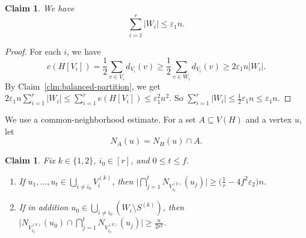 \documentclass[11pt,a4paper]{article}
\newtheorem{claim}[theorem]{Claim}
\theoremstyle{definition}
\theoremstyle{plain}
\newcommand{\eps}{\varepsilon}
\renewcommand{\le}{\leqslant}
\renewcommand{\ge}{\geqslant}
\begin{document}
\begin{claim}\label{clm:W-small}
We have
\[
  \sum_{i=1}^r |W_i|\le \eps_1n.
\]
\end{claim}

\begin{proof}
For each $i$, we have 
\[
  e(H[V_i])
  =
  \frac12\sum_{v\in V_i}d_{V_i}(v)
  \ge
  \frac12\sum_{v\in W_i}d_{V_i}(v)
  \ge
  2\eps_1n|W_i|.
\]
By Claim~\ref{clm:balanced-partition}, we get 
$2\eps_1n\sum_{i=1}^r |W_i| \le 
  \sum_{i=1}^r e(H[V_i])\le \eps_1^2n^2$. 
So $ \sum_{i=1}^r |W_i|
  \le
  \frac12\eps_1n
  \le
  \eps_1n.$ 
\end{proof}

We use a common-neighborhood estimate.  For a set $A\subseteq V(H)$ and a vertex $u$, let
\[
  N_A(u)=N_H(u)\cap A.
\]


\begin{claim}\label{clm:common-neighborhood}
Fix $k\in\{1,2\}$, $i_0\in[r]$, and $0\le t\le f$. 
\begin{enumerate}[label=\textup{(\roman*)}]
\item If $u_1,\ldots,u_t\in\bigcup_{i\ne i_0}V_i^{(k)}$, then
  $\big|\bigcap_{j=1}^t N_{V_{i_0}^{(k)}}(u_j)\big|\ge\big(\tfrac1r-4f^2\eps_2\big)n$.
\item If in addition $u_0\in\bigcup_{i\ne i_0}(W_i\setminus S^{(k)})$, then
  $\big|N_{V_{i_0}^{(k)}}(u_0)\cap\bigcap_{j=1}^t N_{V_{i_0}^{(k)}}(u_j)\big|\ge\tfrac{n}{2r^2}$.
\end{enumerate}
\end{claim}
\end{document}

